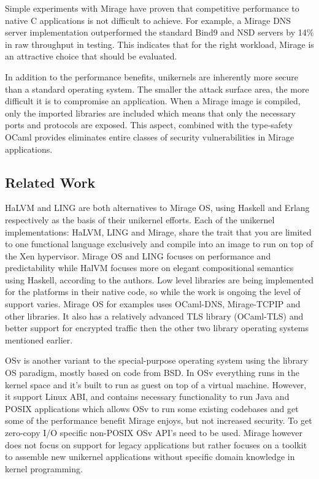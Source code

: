 \documentclass[english,10pt,twocolumn]{article}
\begin{document}
Simple experiments with Mirage have proven that competitive performance to native C applications is not difficult to achieve.
For example, a Mirage DNS server implementation outperformed the standard Bind9 and NSD servers by 14\% in raw throughput in testing.
This indicates that for the right workload, Mirage is an attractive choice that should be evaluated.

In addition to the performance benefits, unikernels are inherently more secure than a standard operating system.
The smaller the attack surface area, the more difficult it is to compromise an application.
When a Mirage image is compiled, only the imported libraries are included which means that only the necessary ports and protocols are exposed.
This aspect, combined with the type-safety OCaml provides eliminates entire classes of security vulnerabilities in Mirage applications.


\subsection{Related Work}

HaLVM\cite{halvm} and LING\cite{ling} are both alternatives to Mirage OS, using Haskell and Erlang respectively as the basis of their unikernel efforts.
Each of the unikernel implementations: HaLVM, LING and Mirage, share the trait that you are limited to one functional language exclusively and compile into an image to run on top of the Xen hypervisor.
Mirage OS and LING focuses on performance and predictability while HalVM focuses more on elegant compositional semantics using Haskell, according to the authors\cite{tripreport}.
Low level libraries are being implemented for the platforms in their native code, so while the work is ongoing the level of support varies.
Mirage OS for examples uses OCaml-DNS, Mirage-TCPIP and other libraries. It also has a relatively advanced TLS library (OCaml-TLS) and better support for encrypted traffic then the other two library operating systems mentioned earlier.

OSv\cite{osv} is another variant to the special-purpose operating system using the library OS paradigm, mostly based on code from BSD.
In OSv everything runs in the kernel space and it's built to run as guest on top of a virtual machine.
However, it support Linux ABI, and contains necessary functionality to run Java and POSIX applications which allows OSv to run some existing codebases and get some of the performance benefit Mirage enjoys, but not increased security.
To get zero-copy I/O specific non-POSIX OSv API's need to be used.
Mirage however does not focus on support for legacy applications but rather focuses on a toolkit to assemble new unikernel applications without specific domain knowledge in kernel programming.
\end{document}
